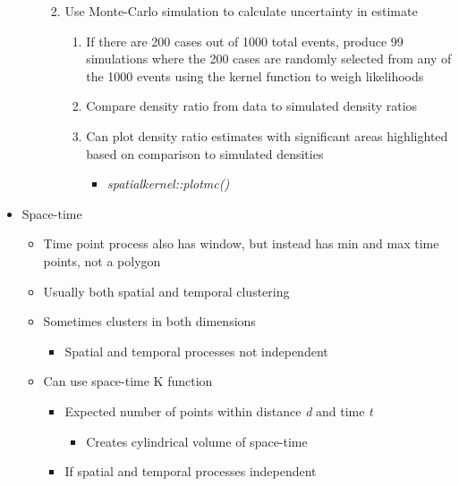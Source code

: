 \documentclass{article}
\begin{document}
\begin{itemize}
\begin{itemize}
\begin{enumerate}
\begin{itemize}
\begin{itemize}
                \end{itemize}
            \end{itemize}
            \item Use Monte-Carlo simulation to calculate uncertainty in estimate
            \begin{enumerate}
                \item If there are 200 cases out of 1000 total events, produce 99 simulations where the 200 cases are randomly selected from any of the 1000 events using the kernel function to weigh likelihoods
                \item Compare density ratio from data to simulated density ratios
                \item Can plot density ratio estimates with significant areas highlighted based on comparison to simulated densities
                \begin{itemize}
                    \item \textit{spatialkernel::plotmc()}
                \end{itemize}
            \end{enumerate}
        \end{enumerate}
    \end{itemize}
    \item Space-time
    \begin{itemize}
        \item Time point process also has window, but instead has min and max time points, not a polygon
        \item Usually both spatial and temporal clustering
        \item Sometimes clusters in both dimensions
        \begin{itemize}
            \item Spatial and temporal processes not independent
        \end{itemize} 
        \item Can use space-time K function
        \begin{itemize}
            \item Expected number of points within distance \textit{d} and time \textit{t}
            \begin{itemize}
                \item Creates cylindrical volume of space-time
            \end{itemize}
            \item If spatial and temporal processes independent

\end{itemize}
\end{itemize}
\end{itemize}
\end{document}
